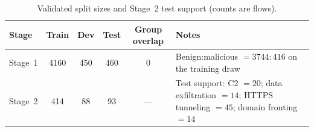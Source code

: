 \begin{table}[t]
  \centering
  \caption{Validated split sizes and Stage~2 test support (counts are flows).}
  \label{tab:exp-splits}
  \footnotesize
  \setlength{\tabcolsep}{4pt}
  \begin{tabular}{@{}lcccc p{}@{}}
    \toprule
    Stage & Train & Dev & Test & Group overlap & Notes \\
    \midrule
    Stage~1 & 4160 & 450 & 460 & 0 &
      Benign:malicious $= 3744{:}416$ on the training draw \\
    Stage~2 & 414 & 88 & 93 & --- &
      Test support: C2 $=20$; data exfiltration $=14$; HTTPS tunneling $=45$; domain fronting $=14$ \\
    \bottomrule
  \end{tabular}
\end{table}
